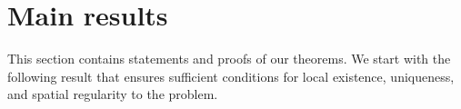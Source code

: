 \documentclass[12pt,reqno]{amsart}
\newtheorem{remark}{Remark}
\begin{document}





\section{Main results} \label{Main}

This section contains statements and proofs of our theorems. We start with the following result that ensures sufficient conditions for local existence, uniqueness, and spatial regularity to the problem.
\end{document}
